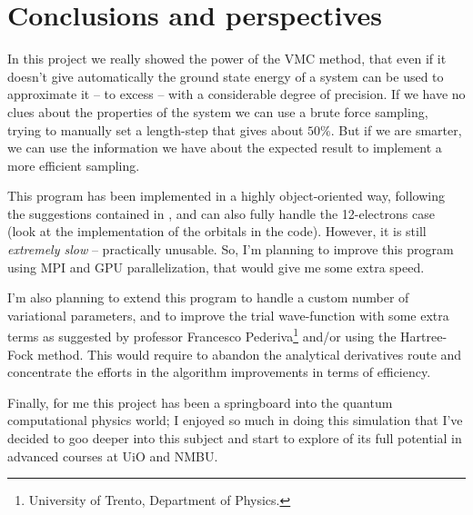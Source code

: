 \documentclass[a4paper,twoside,11pt]{book}
\begin{document}
\chapter{Conclusions and perspectives}
In this project we really showed the power of the VMC method, that even if it doesn't give automatically the ground state energy of a system can be used to approximate it -- to excess -- with a considerable degree of precision. If we have no clues about the properties of the system we can use a brute force sampling, trying to manually set a length-step that gives about $50\%$. But if we are smarter, we can use the information we have about the expected result to implement a more efficient sampling.

This program has been implemented in a highly object-oriented way, following the suggestions contained in \cite{Hoegberget2013}, and can also fully handle the 12-electrons case (look at the implementation of the orbitals in the code). However, it is still \emph{extremely slow} -- practically unusable. So, I'm planning to improve this program using MPI and GPU parallelization, that would give me some extra speed.

I'm also planning to extend this program to handle a custom number of variational parameters, and to improve the trial wave-function with some extra terms as suggested by professor Francesco Pederiva\footnote{University of Trento, Department of Physics.} and/or using the Hartree-Fock method. This would require to abandon the analytical derivatives route and concentrate the efforts in the algorithm improvements in terms of efficiency.

Finally, for me this project has been a springboard into the quantum computational physics world; I enjoyed so much in doing this simulation that I've decided to goo deeper into this subject and start to explore of its full potential in advanced courses at UiO and NMBU.













\backmatter






\end{document}
